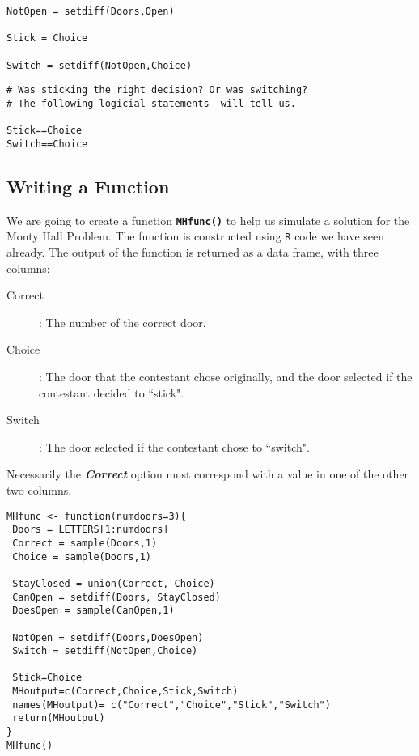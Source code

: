\documentclass[a4paper,12pt]{article}
\begin{document}
\begin{framed}
\begin{verbatim}
NotOpen = setdiff(Doors,Open)

Stick = Choice        
   
Switch = setdiff(NotOpen,Choice)
\end{verbatim} 
\end{framed}


\begin{framed}
	\begin{verbatim}
# Was sticking the right decision? Or was switching?
# The following logicial statements  will tell us.

Stick==Choice
Switch==Choice
\end{verbatim} 
\end{framed}


\subsection{Writing a Function}
We are going to create a function \texttt{\textbf{MHfunc()}} to help us simulate a solution for the Monty Hall Problem. The function is constructed using \texttt{R} code we have seen already. The output of the function is returned as a data frame, with three columns:
\begin{description}
\item[Correct] : The number of the correct door.
\item[Choice] :  The door that the contestant chose originally, and the door selected if the contestant decided to ``stick".
\item[Switch] : The door selected if the contestant chose to ``switch".
\end{description}
Necessarily the \textbf{\textit{Correct}} option must correspond with a value in one of the other two columns.
\begin{framed}
\begin{verbatim}
MHfunc <- function(numdoors=3){
 Doors = LETTERS[1:numdoors]
 Correct = sample(Doors,1)
 Choice = sample(Doors,1)
 
 StayClosed = union(Correct, Choice)
 CanOpen = setdiff(Doors, StayClosed)
 DoesOpen = sample(CanOpen,1)
 
 NotOpen = setdiff(Doors,DoesOpen)
 Switch = setdiff(NotOpen,Choice)

 Stick=Choice 
 MHoutput=c(Correct,Choice,Stick,Switch)
 names(MHoutput)= c("Correct","Choice","Stick","Switch")
 return(MHoutput)
}
MHfunc()

\end{verbatim} 
\end{framed}
\end{document}
